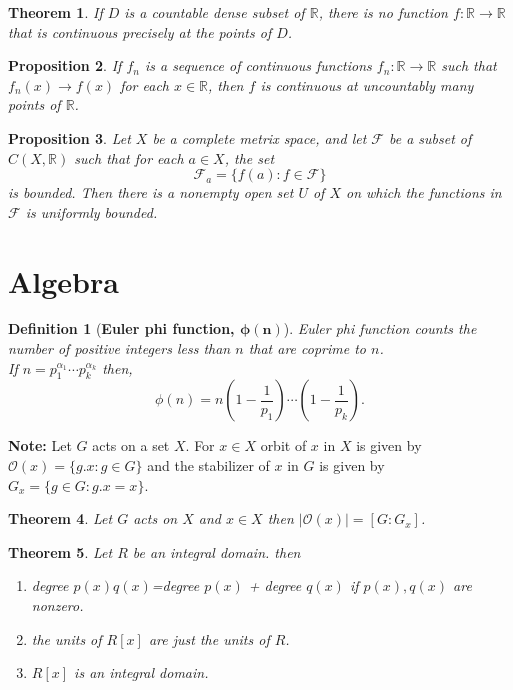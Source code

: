 \documentclass[answers, a4paper, 12pt]{exam}
\newtheorem{theorem}{Theorem}[section]
\newtheorem{proposition}[theorem]{Proposition}
\newtheorem{definition}{Definition}
\newcommand{\R}{\mathbb{R}}
\begin{document}
\begin{theorem}
    If $D$ is a countable dense subset of $\R$, there is no function $f:\R\to\R$ that is continuous precisely at the points of $D$.
\end{theorem}

\begin{proposition}
    If $f_n$ is a sequence of continuous functions $f_n:\R\to\R$ such that $f_n(x)\to f(x)$ for each $x\in\R$, then $f$ is continuous at uncountably many points of $\R$.
\end{proposition}

\begin{proposition}
    Let $X$ be a complete metrix space, and let $\mathcal{F}$ be a subset of $C(X,\R)$ such that for each $a\in X$, the set
    $$\mathcal{F}_a=\{f(a): f\in\mathcal{F}\}$$
    is bounded. Then there is a nonempty open set $U$ of $X$ on which the functions in $\mathcal{F}$ is uniformly bounded.
\end{proposition}

\newpage
\section{Algebra}
\begin{definition}[\textbf{Euler phi function, $\bm{\phi(n)}$}]
    Euler phi function counts the number of positive integers less than $n$ that are coprime to $n$.\\
    If $n=p_1^{\alpha_1}\cdots p_k^{\alpha_k}$ then,
    $$\phi(n)=n\left(1-\frac{1}{p_1}\right)\cdots\left(1-\frac{1}{p_k}\right).$$
\end{definition}
\textbf{Note:} Let $G$ acts on a set $X$. For $x\in X$ orbit of $x$ in $X$ is given by $\mathcal{O}(x)=\{g.x : g\in G\}$ and the stabilizer of $x$ in $G$ is given by $G_x=\{g\in G : g.x=x\}$.

\begin{theorem}
    Let $G$ acts on $X$ and $x\in X$ then $|\mathcal{O}(x)|=[G:G_x]$.
\end{theorem}
\begin{theorem}
    Let $R$ be an integral domain. then
    \begin{enumerate}
        \item degree $p(x)q(x)$=degree $p(x)$ + degree $q(x)$ if $p(x), q(x)$ are nonzero.
        \item the units of $R[x]$ are just the units of $R$.
        \item $R[x]$ is an integral domain.
    \end{enumerate}
\end{theorem}
\end{document}
